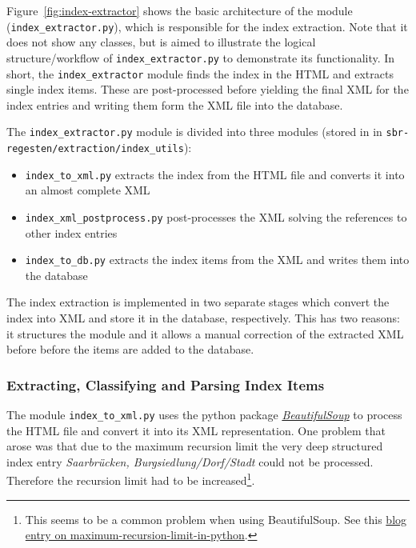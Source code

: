 Figure~\ref{fig:index-extractor} shows the basic architecture of the module (\texttt{index\_extractor.py}), which is responsible for the index extraction. Note that it does not show any classes, but is aimed to illustrate the logical structure/workflow of \texttt{index\_extractor.py} to demonstrate its functionality. In short, the \texttt{index\_extractor} module finds the index in the HTML and extracts single index items. These are post-processed before yielding the final XML for the index entries and writing them form the XML file into the database.

The \texttt{index\_extractor.py} module is divided into three modules (stored in in \texttt{sbr-regesten/\-extraction/\-index\_utils}):

\begin{itemize}
\item \texttt{index\_to\_xml.py} extracts the index from the HTML file and converts it into an almost complete XML
\item \texttt{index\_xml\_postprocess.py} post-processes the XML solving the references to other index entries
\item \texttt{index\_to\_db.py} extracts the index items from the XML and writes them into the database
\end{itemize}

The index extraction is implemented in two separate stages which convert the index into XML and store it in the database, respectively. This has two reasons: it structures the module and it allows a manual correction of the extracted XML before before the items are added to the database.

\subsubsection{Extracting, Classifying and Parsing Index Items}
The module \texttt{index\_to\_xml.py} uses the python package \href{http://www.crummy.com/software/BeautifulSoup/bs4/doc/} {\textit{BeautifulSoup}} to process the HTML file and convert it into its XML representation. One problem that arose was that due to the maximum recursion limit the very deep structured index entry \textit{Saarbrücken, Burgsiedlung/Dorf/Stadt} could not be processed. Therefore the recursion limit had to be increased\footnote{This seems to be a common problem when using BeautifulSoup. See this  \href{http://blog.pablohoffman.com/maximum-recursion-limit-in-python}{blog entry on maximum-recursion-limit-in-python}.}.

